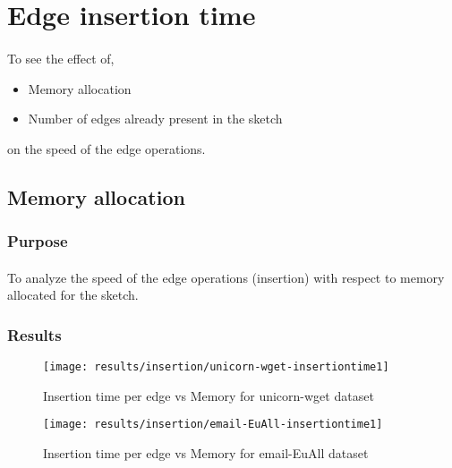 \section{Edge insertion time}

\paragraph{}
To see the effect of,

\begin{itemize}
    \item Memory allocation
    \item Number of edges already present in the sketch
\end{itemize}

on the speed of the edge operations.

\subsection*{Memory allocation}

\subsubsection{Purpose}

\paragraph{}
To analyze the speed of the edge operations (insertion) with respect to memory allocated for the sketch.

\subsubsection{Results}

\begin{figure}[H]
    \centering \texttt{[image: results/insertion/unicorn-wget-insertiontime1]}
    \vspace{-0.5cm}
    \caption{Insertion time per edge vs Memory for unicorn-wget dataset}
    \label{fig:unicorn-wget-insertiontime1}
\end{figure}

\begin{figure}[H]
    \centering \texttt{[image: results/insertion/email-EuAll-insertiontime1]}
    \vspace{-0.5cm}
    \caption{Insertion time per edge vs Memory for email-EuAll dataset}
    \label{fig:email-EuAll-insertiontime1}
\end{figure}

